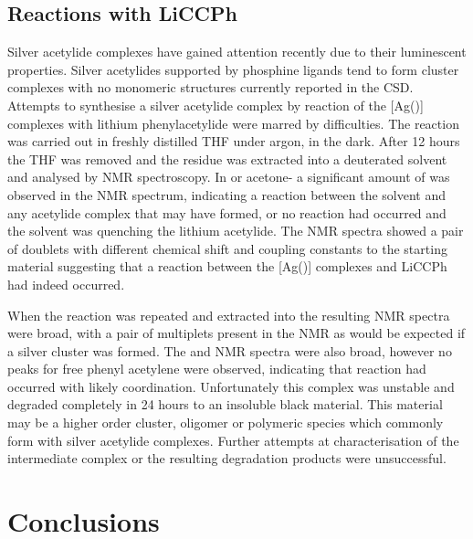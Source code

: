 \subsection{Reactions with LiCCPh}

Silver acetylide complexes have gained attention recently due to their luminescent properties.\cite{Yam1997, Yam1998, Xu2013}  Silver acetylides supported by phosphine ligands tend to form cluster complexes with no monomeric structures currently reported in the \gls{CSD}.\cite{Allen2002}  Attempts to synthesise a silver acetylide complex by reaction of the [Ag(\tBuxantphos)] complexes with lithium phenylacetylide were marred by difficulties.  The reaction was carried out in freshly distilled THF under argon, in the dark.  After 12 hours the THF was removed  and the residue was extracted into a deuterated solvent and analysed by NMR spectroscopy.  In  or acetone- a significant amount of  was observed in the \carbon{} NMR spectrum, indicating a reaction between the solvent and any acetylide complex that may have formed, or no reaction had occurred and the solvent was quenching the lithium acetylide.  The \phosphorus{} NMR spectra showed a pair of doublets with different chemical shift and coupling constants to the starting material suggesting that a reaction between the [Ag(\tBuxantphos)] complexes and LiCCPh had indeed occurred. 

When the reaction was repeated and extracted into  the resulting NMR spectra were broad, with a pair of multiplets present in the \phosphorus{} NMR as would be expected if a silver cluster was formed.  The \proton{} and \carbon{} NMR spectra were also broad, however no peaks for free phenyl acetylene were observed, indicating that reaction had occurred with likely coordination.  Unfortunately this complex was unstable and degraded completely in 24 hours to an insoluble black material.  This material may be a higher order cluster, oligomer or polymeric species which commonly form with silver acetylide complexes.  Further attempts at characterisation of the intermediate complex or the resulting degradation products were unsuccessful.

\section{Conclusions}





